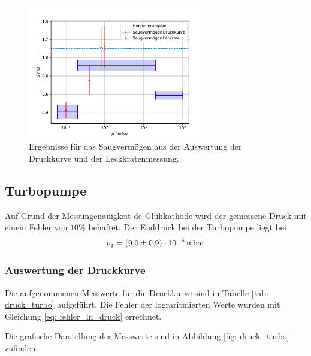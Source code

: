 \begin{figure}[h]
  \centering
  \includegraphics[width=0.7\textwidth]{../Messdaten/plots/dreh/dreh_leck_und_druck.pdf}
  \caption{Ergebnisse für das Saugvermögen aus der Auswertung der Druckkurve und der Leckkratenmessung.}
  \label{fig: dreh_druck_leck}
\end{figure}

\subsection{Turbopumpe}
Auf Grund der Messungenauigkeit de Glühkathode wird der gemessene
Druck mit einem Fehler von $10\%$ behaftet.
Der Enddruck bei der Turbopumpe liegt bei
\begin{equation}
  \label{eq:enddruck_drehschieber}
  p_{\mathrm{g}}=\SI{9.0 \pm 0.9 e-6}{\milli\bar}
\end{equation}

\subsubsection{Auswertung der Druckkurve}
Die aufgenommenen Messwerte für die Druckkurve sind in Tabelle \ref{tab: druck_turbo}
aufgeführt. Die Fehler der lograritmierten Werte wurden mit Gleichung \eqref{eq: fehler_ln_druck} errechnet.


Die grafische Darstellung der Messwerte sind in Abbildung \ref{fig: druck_turbo} zufinden.


